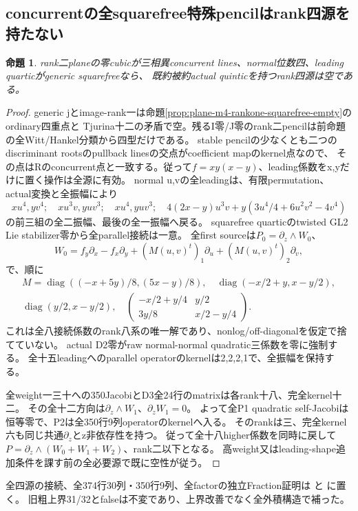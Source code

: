 \documentclass[a4paper,11pt]{ltjsarticle}
\newtheorem{proposition}{命題}[section]
\theoremstyle{definition}
\begin{document}
\subsection{concurrentの全squarefree特殊pencilはrank四源を持たない}
\begin{proposition}\label{prop:plane-concurrent-m4-squarefree-empty}
rank二planeの零cubicが三相異concurrent lines、normal位数四、leading quarticがgeneric squarefreeなら、
既約被約actual quinticを持つrank四源は空である。
\end{proposition}
\begin{proof}
generic jとimage-rank一は命題\ref{prop:plane-m4-rankone-squarefree-empty}のordinary四重点と
Tjurina十二の矛盾で空。残るI零/J零のrank二pencilは前命題の全Witt/Hankel分類から四型だけである。
stable pencilの少なくとも二つのdiscriminant rootsのpullback linesの交点がcoefficient mapのkernel点なので、
その点はRのconcurrent点と一致する。従って$f=xy(x-y)$、leading係数をx,yだけに置く操作は全源に有効。
normal u,vの全leadingは、有限permutation、actual変換と全振幅により
\[
 xu^4,yv^4;\quad xu^3v,yuv^3;\quad xu^4,yuv^3;\quad
 4(2x-y)u^3v+y(3u^4/4+6u^2v^2-4v^4)
\]
の前三組の全二振幅、最後の全一振幅へ戻る。
squarefree quarticのtwisted GL2 Lie stabilizer零から全parallel接続は一意。
全first sourceは$P_0=\partial_z\wedge W_0$、
\[
 W_0=f_y\partial_x-f_x\partial_y+(M(u,v)^t)_1\partial_u+(M(u,v)^t)_2\partial_v,
\]
で、順に
\[
\begin{gathered}
 M=\operatorname{diag}((-x+5y)/8,(5x-y)/8),\quad
 \operatorname{diag}(-x/2+y,x-y/2),\\
 \operatorname{diag}(y/2,x-y/2),\quad
 \begin{pmatrix}-x/2+y/4&y/2\\3y/8&x/2-y/4\end{pmatrix}.
\end{gathered}
\]
これは全八接続係数のrank八系の唯一解であり、nonlog/off-diagonalを仮定で捨てていない。
actual D2零がraw normal-normal quadratic三係数を零に強制する。
全十五leadingへのparallel operatorのkernelは2,2,2,1で、全振幅を保持する。

全weight一三十への350JacobiとD3全24行のmatrixは各rank十八、完全kernel十二。
その全十二方向は$\partial_z\wedge W_1$、$\partial_zW_1=0$。
よって全P1 quadratic self-Jacobiは恒等零で、P2は全350行9列operatorのkernelへ入る。
そのrankは三、完全kernel六も同じ共通$\partial_z$とz非依存性を持つ。
従って全十八higher係数を同時に戻して
$P=\partial_z\wedge(W_0+W_1+W_2)$、rank二以下となる。
高weight又はleading-shape追加条件を課す前の全必要源で既に空性が従う。
\end{proof}
全四源の接続、全374行30列・350行9列、全factorの独立Fraction証明は
と
に置く。
旧粗上界31/32とfalseは不変であり、上界改善でなく全外積構造で補った。
\end{document}
